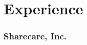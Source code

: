 \newcommand{\headerrow}[3] {
\item[] #1 \hfill #3}
%
\newenvironment{position}{
  \begin{itemize}[leftmargin=*]
    \setlength{\itemsep}{1pt}
    \setlength{\parskip}{0pt}
    \setlength{\parsep}{0pt}
}{\end{itemize}}

\section{Experience}

\subsubsection{Sharecare, Inc.}

